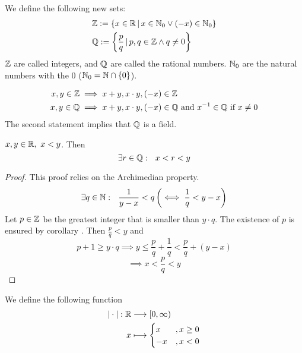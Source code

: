 \documentclass[../../script.tex]{subfiles}
\begin{document}
\begin{defi}
We define the following new sets:
\begin{align*}
	&\mathbb{Z} := \{x \in \mathbb{R} \,\vert\, x \in \mathbb{N}_0 \vee (-x) \in \mathbb{N}_0\}\\
	&\mathbb{Q} := \left\{\frac{p}{q} \,\vert\, p, q \in \mathbb{Z} \wedge q \ne 0\right\}
\end{align*}
$\mathbb{Z}$ are called integers, and $\mathbb{Q}$ are called the rational numbers. $\mathbb{N}_0$ are the natural numbers with the $0$ ($\mathbb{N}_0 = \mathbb{N} \cap \{0\}$).
\end{defi}

\begin{rem}
\begin{align*}
	x, y \in \mathbb{Z} &\implies x+y, x\cdot y, (-x) \in \mathbb{Z} \\
	x, y \in \mathbb{Q} &\implies x+y, x\cdot y, (-x) \in \mathbb{Q} \text{ and } {x}^{-1} \in \mathbb{Q} \text{ if } x \ne 0
\end{align*}
The second statement implies that $\mathbb{Q}$ is a field.
\end{rem}

\begin{cor}
$x, y \in \mathbb{R}, ~x < y$. Then
\[
	\exists r \in \mathbb{Q}: ~~x < r < y
\]
\end{cor}
\begin{proof}
This proof relies on the Archimedian property.
\begin{equation}
	\exists q \in \mathbb{N}: ~~ \frac{1}{y-x} < q \left( \iff \frac{1}{q} < y - x \right)
\end{equation}
Let $p \in \mathbb{Z}$ be the greatest integer that is smaller than $y \cdot q$. The existence of $p$ is ensured by corollary . Then $\frac{p}{q} < y$ and
\begin{equation}
	p + 1 \ge y \cdot q \implies y \le \frac{p}{q} + \frac{1}{q} < \frac{p}{q} + (y - x)
\end{equation}
\begin{equation}
	\implies x < \frac{p}{q} < y
\end{equation}
\end{proof}

\begin{defi}
We define the following function
\begin{align*}
	|\cdot|: \mathbb{R} &\longrightarrow [0, \infty) \\
	x &\longmapsto 
	\begin{cases}
		x &, x \ge 0 \\
		-x &, x < 0
	\end{cases}
\end{align*}
\end{defi}
\end{document}
